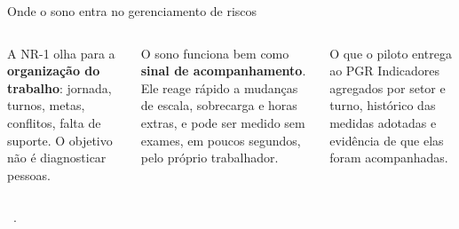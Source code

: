 \documentclass[aspectratio=169,10pt]{beamer}
\newcommand{\fonte}[1]{\par\vfill{\tiny\color{mudo}\faBookOpen\ #1\par}}
\begin{document}
\begin{frame}{Onde o sono entra no gerenciamento de riscos}
\begin{columns}[c,onlytextwidth]
\centering
{}
\small
A NR-1 olha para a \textbf{organização do trabalho}: jornada, turnos,
metas, conflitos, falta de suporte. O objetivo não é diagnosticar pessoas.

\medskip
O sono funciona bem como \textbf{sinal de acompanhamento}. Ele reage rápido
a mudanças de escala, sobrecarga e horas extras, e pode ser medido sem
exames, em poucos segundos, pelo próprio trabalhador.

\medskip
\begin{block}{O que o piloto entrega ao PGR}
\scriptsize Indicadores agregados por setor e turno, histórico das
medidas adotadas e evidência de que elas foram acompanhadas.
\end{block}
\end{columns}
\fonte{\textcite{mte_nr1_2025,mte_guia_psicossociais_2025}.}
\end{frame}
\end{document}
